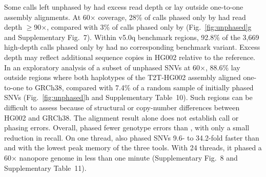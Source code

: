 Some calls left unphased by \toolname had excess read depth or lay outside one-to-one assembly alignments. At 60$\times$ coverage, 28\% of calls phased only by \whatshap had read depth $\geq$90$\times$, compared with 3\% of calls phased only by \toolname (Fig.~\ref{fig:unphased}g and Supplementary Fig.~7). Within v5.0q benchmark regions, 92.8\% of the 3,669 high-depth calls phased only by \whatshap had no corresponding benchmark variant. Excess depth may reflect additional sequence copies in HG002 relative to the reference\cite{olson2026giabv5}. In an exploratory analysis of a subset of unphased SNVs at 60$\times$, 88.6\% lay outside regions where both haplotypes of the T2T-HG002 assembly aligned one-to-one to GRCh38, compared with 7.4\% of a random sample of initially phased SNVs (Fig.~\ref{fig:unphased}h and Supplementary Table~10). Such regions can be difficult to assess because of structural or copy-number differences between HG002 and GRCh38\cite{olson2026giabv5}. The alignment result alone does not establish call or phasing errors. Overall, \toolname phased fewer genotype errors than \whatshap, with only a small reduction in recall. On one thread, \toolname also phased SNVs 9.6- to 34.2-fold faster than \whatshap and \hapcut with the lowest peak memory of the three tools. With 24 threads, it phased a 60$\times$ nanopore genome in less than one minute (Supplementary Fig.~8 and Supplementary Table~11).

